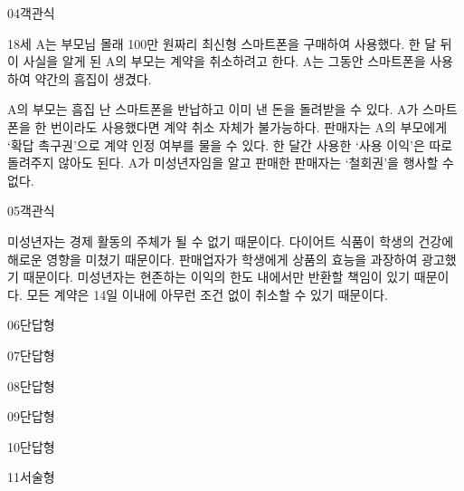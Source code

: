 \documentclass[fs9,seriesRus]{korfarm-base}
\begin{document}
\begin{kfQBlock}{04}{객관식}
\begin{kfEvidence}18세 A는 부모님 몰래 100만 원짜리 최신형 스마트폰을 구매하여 사용했다. 한 달 뒤 이 사실을 알게 된 A의 부모는 계약을 취소하려고 한다. A는 그동안 스마트폰을 사용하여 약간의 흠집이 생겼다.\end{kfEvidence}
\begin{kfChoices}
\kfChoice A의 부모는 흠집 난 스마트폰을 반납하고 이미 낸 돈을 돌려받을 수 있다.
\kfChoice A가 스마트폰을 한 번이라도 사용했다면 계약 취소 자체가 불가능하다.
\kfChoice 판매자는 A의 부모에게 ‘확답 촉구권’으로 계약 인정 여부를 물을 수 있다.
\kfChoice 한 달간 사용한 ‘사용 이익’은 따로 돌려주지 않아도 된다.
\kfChoice A가 미성년자임을 알고 판매한 판매자는 ‘철회권’을 행사할 수 없다.
\end{kfChoices}
\end{kfQBlock}
\begin{kfQBlock}{05}{객관식}
\begin{kfChoices}
\kfChoice 미성년자는 경제 활동의 주체가 될 수 없기 때문이다.
\kfChoice 다이어트 식품이 학생의 건강에 해로운 영향을 미쳤기 때문이다.
\kfChoice 판매업자가 학생에게 상품의 효능을 과장하여 광고했기 때문이다.
\kfChoice 미성년자는 현존하는 이익의 한도 내에서만 반환할 책임이 있기 때문이다.
\kfChoice 모든 계약은 14일 이내에 아무런 조건 없이 취소할 수 있기 때문이다.
\end{kfChoices}
\end{kfQBlock}
\begin{kfQBlock}{06}{단답형}
\end{kfQBlock}
\begin{kfQBlock}{07}{단답형}
\end{kfQBlock}
\begin{kfQBlock}{08}{단답형}
\end{kfQBlock}
\begin{kfQBlock}{09}{단답형}
\end{kfQBlock}
\begin{kfQBlock}{10}{단답형}
\end{kfQBlock}
\begin{kfQBlock}{11}{서술형}
\end{kfQBlock}
\kfEndMC
\end{document}
